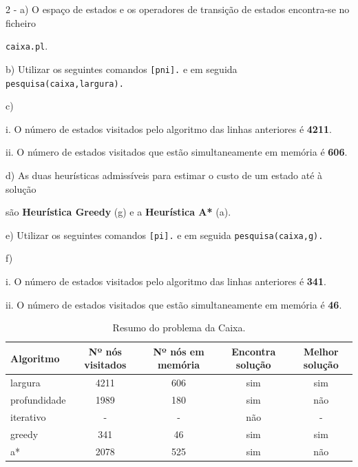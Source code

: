 \documentclass[11pt]{article}
\begin{document}
\newpage

2 - a) O espaço de estados e os operadores de transição de estados encontra-se no ficheiro

\hspace{1,1cm}\verb|caixa.pl|.

\hspace{0,6cm}b) Utilizar os seguintes comandos \verb|[pni].| e em seguida 
\verb|pesquisa(caixa,largura).|

\hspace{0,6cm}c)

\hspace{1cm}i. O número de estados visitados pelo algoritmo das linhas anteriores é \textbf{4211}.

\hspace{1cm}ii. O número de estados visitados que estão simultaneamente em memória é \textbf{606}.

\hspace{0,6cm}d) As duas heurísticas admissíveis para estimar o custo de um estado até à solução

\hspace{1,1cm}são \textbf{Heurística Greedy} (g) e a \textbf{Heurística A*} (a).

\hspace{0,6cm}e) Utilizar os seguintes comandos \verb|[pi].| e em seguida 
\verb|pesquisa(caixa,g).|

\hspace{0,6cm}f)

\hspace{1cm}i. O número de estados visitados pelo algoritmo das linhas anteriores é \textbf{341}.

\hspace{1cm}ii. O número de estados visitados que estão simultaneamente em memória é \textbf{46}.


\begin{table}[h!]
    \begin{center}
        \begin{tabular}{l|c|c|c|c}
            \textbf{Algoritmo} & \textbf{Nº nós visitados} & \textbf{Nº nós em memória} & \textbf{Encontra solução} & \textbf{Melhor solução}\\
            \hline
            largura      & 4211 & 606 & sim & sim \\
            \hline
            profundidade & 1989 & 180 & sim & não \\
            \hline
            iterativo    & -    & -   & não & -   \\
            \hline
            greedy       & 341  & 46  & sim & sim \\
            \hline
            a*           & 2078 & 525 & sim & não
        \end{tabular}
        \caption{Resumo do problema da Caixa.}
        \label{tab:table1}
    \end{center}
\end{table}

\end{document}
